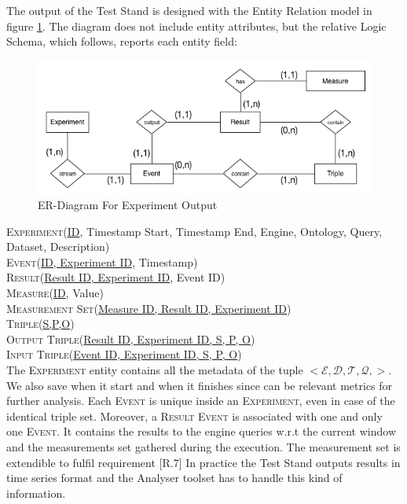 \noindent The output of the Test Stand is designed with the Entity Relation model in figure \ref{fig:er}. The diagram does not include entity attributes, but the relative Logic Schema, which follows, reports each entity field:\\
\begin{figure}[tbh]
  \centering
	\includegraphics[width=\linewidth]{images/er-db}
	\caption{ER-Diagram For Experiment Output} 
  	\label{fig:er}
\end{figure}

\pagebreak

\noindent\textsc{Experiment}(\underline{ID}, Timestamp Start, Timestamp End, Engine, Ontology, Query, Dataset, Description)\\
\textsc{Event}(\underline{ID, Experiment ID}, Timestamp)\\
\textsc{Result}(\underline{Result ID, Experiment ID}, Event ID)\\
\textsc{Measure}(\underline{ID}, Value)\\
\textsc{Measurement Set}(\underline{Measure ID, Result ID, Experiment ID})\\
\textsc{Triple}(\underline{S,P,O})\\
\textsc{Output Triple}(\underline{Result ID, Experiment ID, S, P, O})\\
\textsc{Input Triple}(\underline{Event ID, Experiment ID, S, P, O})\\

The \textsc{Experiment} entity contains all the metadata of the tuple $<\mathcal{E},\mathcal{D},\mathcal{T},\mathcal{Q},>$. We  also save when it start and when it finishes since can be relevant metrics for further analysis. Each \textsc{Event} is unique inside an \textsc{Experiment}, even in case of the identical triple set. Moreover, a \textsc{Result Event} is associated with one and only one \textsc{Event}. It contains the results to the engine queries w.r.t the current window and the measurements set gathered during the execution. The measurement set is extendible to fulfil requirement [R.7]
In practice the Test Stand outputs results in time series format and  the Analyser toolset has to handle this kind of information. 

